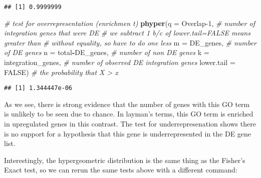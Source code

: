 \documentclass[
]{book}
\newenvironment{Shaded}{\begin{snugshade}}{\end{snugshade}}
\newcommand{\AttributeTok}[1]{\textcolor[rgb]{0.13,0.29,0.53}{#1}}
\newcommand{\CommentTok}[1]{\textcolor[rgb]{0.56,0.35,0.01}{\textit{#1}}}
\newcommand{\ConstantTok}[1]{\textcolor[rgb]{0.56,0.35,0.01}{#1}}
\newcommand{\DecValTok}[1]{\textcolor[rgb]{0.00,0.00,0.81}{#1}}
\newcommand{\FunctionTok}[1]{\textcolor[rgb]{0.13,0.29,0.53}{\textbf{#1}}}
\newcommand{\NormalTok}[1]{#1}
\newcommand{\SpecialCharTok}[1]{\textcolor[rgb]{0.81,0.36,0.00}{\textbf{#1}}}
\newcommand{\StringTok}[1]{\textcolor[rgb]{0.31,0.60,0.02}{#1}}
\begin{document}
\begin{verbatim}
## [1] 0.9999999
\end{verbatim}

\begin{Shaded}
\begin{Highlighting}[]
\CommentTok{\# test for overrepresentation (enrichmen t)}
\FunctionTok{phyper}\NormalTok{(}\AttributeTok{q =}\NormalTok{ Overlap}\DecValTok{{-}1}\NormalTok{, }\CommentTok{\# number of integration genes that were DE}
                      \CommentTok{\# we subtract 1 b/c of lower.tail=FALSE means greater than}
                      \CommentTok{\# without equality, so have to do one less}
       \AttributeTok{m =}\NormalTok{ DE\_genes, }\CommentTok{\# number of DE genes}
       \AttributeTok{n =}\NormalTok{ total}\SpecialCharTok{{-}}\NormalTok{DE\_genes, }\CommentTok{\# number of non DE genes}
       \AttributeTok{k =}\NormalTok{ integration\_genes, }\CommentTok{\# number of observed DE integration genes}
       \AttributeTok{lower.tail =} \ConstantTok{FALSE}\NormalTok{) }\CommentTok{\# the probability that X \textgreater{} x}
\end{Highlighting}
\end{Shaded}

\begin{verbatim}
## [1] 1.344447e-06
\end{verbatim}

As we see, there is strong evidence that the number of genes with this GO term is unlikely to be seen due to chance. In layman's terms, this GO term is enriched in upregulated genes in this contrast. The test for underrepresenation shows there is no support for a hypothesis that this gene is underrepresented in the DE gene list.

Interestingly, the hypergeometric distribution is the same thing as the Fisher's Exact test, so we can rerun the same tests above with a different command:

\begin{Shaded}
\end{Shaded}
\end{document}
